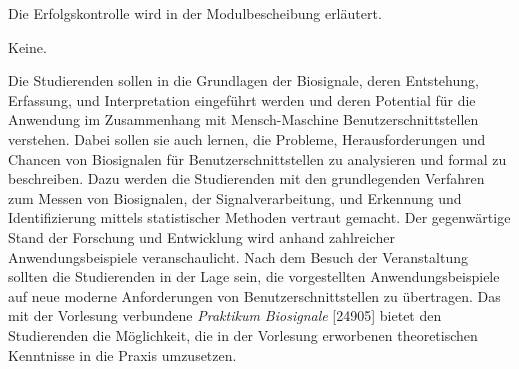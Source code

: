 \begin{course}

\setdoclanguagegerman
{}



\coursehead


\label{cour_7303.dp_997}


\begin{styleenv}
\begin{assessment}
Die Erfolgskontrolle wird in der Modulbescheibung erläutert.


\end{assessment}

\begin{conditions}Keine.\end{conditions}


\end{styleenv}

\begin{learningoutcomes}
Die Studierenden sollen in die Grundlagen der Biosignale, deren Entstehung, Erfassung, und Interpretation eingeführt werden und deren Potential für die Anwendung im Zusammenhang mit Mensch-Maschine Benutzerschnittstellen verstehen. Dabei sollen sie auch lernen, die Probleme, Herausforderungen und Chancen von Biosignalen für Benutzerschnittstellen zu analysieren und formal zu beschreiben. Dazu werden die Studierenden mit den grundlegenden Verfahren zum Messen von Biosignalen, der Signalverarbeitung, und Erkennung und Identifizierung mittels statistischer Methoden vertraut gemacht. Der gegenwärtige Stand der Forschung und Entwicklung wird anhand zahlreicher Anwendungsbeispiele veranschaulicht. Nach dem Besuch der Veranstaltung sollten die Studierenden in der Lage sein, die vorgestellten Anwendungsbeispiele auf neue moderne Anforderungen von Benutzerschnittstellen zu übertragen.\newline
\newline
Das mit der Vorlesung verbundene \emph{Praktikum Biosignale} [24905] bietet den Studierenden die Möglichkeit, die in der Vorlesung erworbenen theoretischen Kenntnisse in die Praxis umzusetzen.



\end{learningoutcomes}
\end{course}
